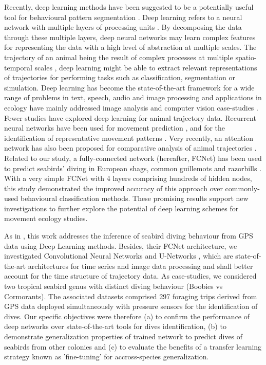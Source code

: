 \documentclass{article}
\begin{document}
Recently, deep learning methods have been suggested to be a potentially useful tool for behavioural pattern segmentation \cite{valletta_applications_2017}. Deep learning refers to a neural network with multiple layers of processing units \cite{lecun_deep_2015}. By decomposing the data through these multiple layers, deep neural networks may learn complex features for representing the data with a high level of abstraction at multiple scales. The trajectory of an animal being the result of complex processes at multiple spatio-temporal scales \cite{nathan_movement_2008}, deep learning might be able to extract relevant representations of trajectories for performing tasks such as classification, segmentation or simulation. Deep learning has become the state-of-the-art framework for a wide range of problems in text, speech, audio and image processing and applications in ecology have mainly addressed image analysis and computer vision case-studies \cite{weinstein_computer_2018, christin_applications_2019}. Fewer studies have explored deep learning for animal trajectory data. Recurrent neural networks have been used for movement prediction \cite{ardakani_encoding_2017,rew_animal_2019}, and for the identification of representative movement patterns \cite{peng_deep_2019}. Very recently, an attention network has also been proposed for comparative analysis of  animal trajectories
\cite{maekawa_deep_2020}. Related to our study, a fully-connected network (hereafter, FCNet) has been used to predict seabirds' diving in European shags, common guillemots and razorbills  \cite{browning_predicting_2018}. With a very simple FCNet with 4 layers comprising hundreds of hidden nodes, this study demonstrated the improved accuracy of this approach over commonly-used behavioural classification methods. These promising results support new investigations to further explore the potential of deep learning schemes for movement ecology studies.

As in \cite{browning_predicting_2018}, this work addresses the inference of seabird diving behaviour from GPS data using Deep Learning methods. Besides, their FCNet architecture, we investigated Convolutional Neural Networks and U-Networks \cite{ronneberger_u-net_2015}, which are state-of-the-art architectures for time series and image data processing and shall better account for the time structure of trajectory data. As case-studies, we considered two tropical seabird genus with distinct diving behaviour (Boobies vs Cormorants). The associated datasets comprised 297 foraging trips derived from GPS data deployed simultaneously with pressure sensors for the identification of dives. Our specific objectives were therefore (a) to confirm the performance of deep networks over state-of-the-art tools for dives identification, (b) to demonstrate generalization properties of trained network to predict dives of seabirds from other colonies and (c) to evaluate the benefits of a transfer learning strategy known as 'fine-tuning' for accross-species generalization.
\end{document}
